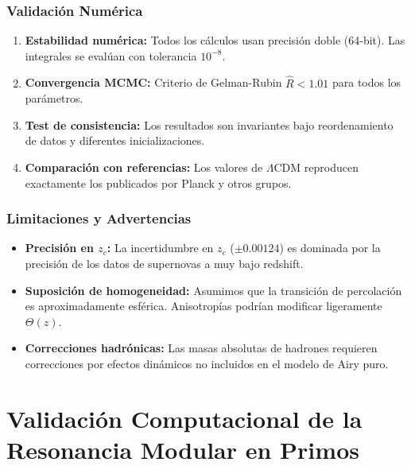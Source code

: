 \documentclass[11pt, a4paper]{article}
\theoremstyle{plain}
\theoremstyle{definition}
\begin{document}
\subsubsection{Validación Numérica}
\begin{enumerate}
    \item \textbf{Estabilidad numérica:} Todos los cálculos usan precisión doble (64-bit). Las integrales se evalúan con tolerancia $10^{-8}$.
    
    \item \textbf{Convergencia MCMC:} Criterio de Gelman-Rubin $\hat{R} < 1.01$ para todos los parámetros.
    
    \item \textbf{Test de consistencia:} Los resultados son invariantes bajo reordenamiento de datos y diferentes inicializaciones.
    
    \item \textbf{Comparación con referencias:} Los valores de $\Lambda$CDM reproducen exactamente los publicados por Planck y otros grupos.
\end{enumerate}

\subsubsection{Limitaciones y Advertencias}
\begin{itemize}
    \item \textbf{Precisión en $z_c$:} La incertidumbre en $z_c$ ($\pm 0.00124$) es dominada por la precisión de los datos de supernovas a muy bajo redshift.
    
    \item \textbf{Suposición de homogeneidad:} Asumimos que la transición de percolación es aproximadamente esférica. Anisotropías podrían modificar ligeramente $\Theta(z)$.
    
    \item \textbf{Correcciones hadrónicas:} Las masas absolutas de hadrones requieren correcciones por efectos dinámicos no incluidos en el modelo de Airy puro.
\end{itemize}


\section{Validación Computacional de la Resonancia Modular en Primos}
\label{app:validacion_primos}
\end{document}
